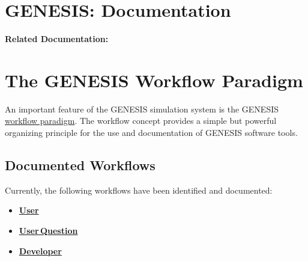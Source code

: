 \documentclass[12pt]{article}
\begin{document}
\section*{GENESIS: Documentation}

{\bf Related Documentation:}

\section*{The GENESIS Workflow Paradigm}

An important feature of the GENESIS simulation system is the GENESIS
\href{http://en.wikipedia.org/wiki/Workflow}{workflow paradigm}. The
workflow concept provides a simple but powerful organizing principle
for the use and documentation of GENESIS software tools.

\subsection*{Documented Workflows}
Currently, the following workflows have been identified and documented:
\begin{itemize}
\item \href{../workflow-user/workflow-user.tex}{\bf User}
\item \href{../workflow-user-query/workflow-user-query.tex}{\bf User\,Question}
\item \href{../workflow-developer/workflow-developer.tex}{\bf Developer}
\end{itemize}
\end{document}
